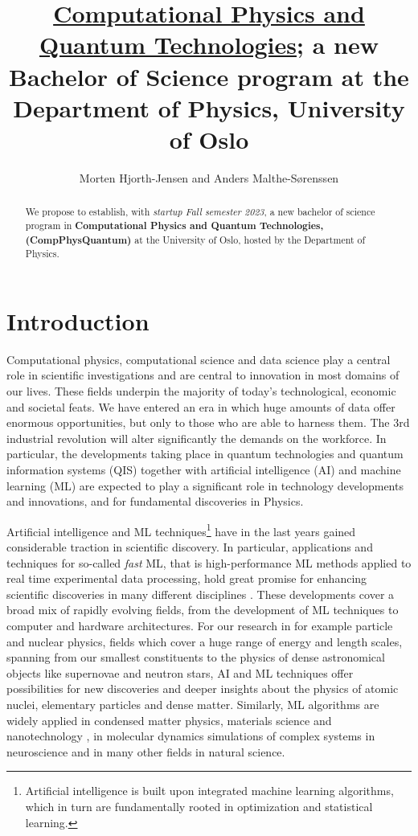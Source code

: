 \documentclass[aps,rmp,preprint,amsmath,amssymb,graphicx,longbibliography]{revtex4-1}
\begin{document}
\title{\underline{Computational Physics and Quantum Technologies}; a new Bachelor of Science program  at the Department of Physics, University of Oslo}

\author{Morten Hjorth-Jensen and Anders Malthe-Sørenssen}


\begin{abstract}
We propose to establish, with {\em startup Fall semester 2023}, a new bachelor of science  program in {\bf Computational Physics and Quantum Technologies, (CompPhysQuantum)}  at the University of Oslo, hosted by the Department of Physics. 
\end{abstract}
\maketitle
\section{Introduction}

Computational physics, computational science and data science play a
central role in scientific investigations and are central to
innovation in most domains of our lives. These fields underpin the
majority of today's technological, economic and societal feats. We
have entered an era in which huge amounts of data offer enormous
opportunities, but only to those who are able to harness them. The 3rd
industrial revolution will alter significantly the demands on the
workforce. In particular, the developments taking place in quantum
technologies and quantum information systems (QIS) together with
artificial intelligence (AI) and machine learning (ML) are expected to
play a significant role in technology developments and innovations,
and for fundamental discoveries in Physics.

Artificial intelligence and ML techniques\footnote{Artificial
intelligence is built upon integrated machine learning algorithms,
which in turn are fundamentally rooted in optimization and statistical
learning.} have in the last years gained considerable traction in
scientific discovery. In particular, applications and techniques for
so-called {\em fast} ML, that is high-performance ML methods applied
to real time experimental data processing, hold great promise for
enhancing scientific discoveries in many different disciplines
\cite{deiana2021}.  These developments cover a broad mix of rapidly
evolving fields, from the development of ML techniques to computer and
hardware architectures. For our research in for example particle and
nuclear physics, fields which cover a huge range of energy and length scales,
spanning from our smallest constituents to the physics of dense
astronomical objects like supernovae and neutron stars, AI and ML
techniques offer possibilities for new discoveries and deeper insights
about the physics of atomic nuclei, elementary particles and dense
matter. Similarly, ML algorithms are widely applied in condensed
matter physics, materials science and nanotechnology
\cite{Schleder2019}, in molecular dynamics simulations of complex
systems in neuroscience and in many other fields in natural science.
\end{document}
